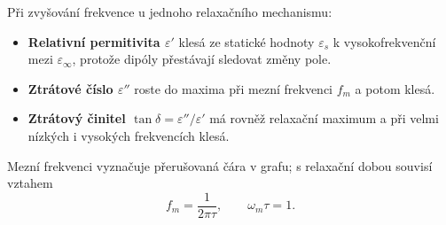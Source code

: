 Při zvyšování frekvence u jednoho relaxačního mechanismu:
\begin{itemize}
\item \textbf{Relativní permitivita $\varepsilon'$} klesá ze statické hodnoty $\varepsilon_s$ k vysokofrekvenční mezi $\varepsilon_\infty$, protože dipóly přestávají sledovat změny pole.
\item \textbf{Ztrátové číslo $\varepsilon''$} roste do maxima při mezní frekvenci $f_m$ a potom klesá.
\item \textbf{Ztrátový činitel $\tan\delta=\varepsilon''/\varepsilon'$} má rovněž relaxační maximum a při velmi nízkých i vysokých frekvencích klesá.
\end{itemize}
Mezní frekvenci vyznačuje přerušovaná čára v grafu; s relaxační dobou souvisí vztahem
\[\boxed{f_m=\frac{1}{2\pi\tau}},\qquad\omega_m\tau=1.\]
